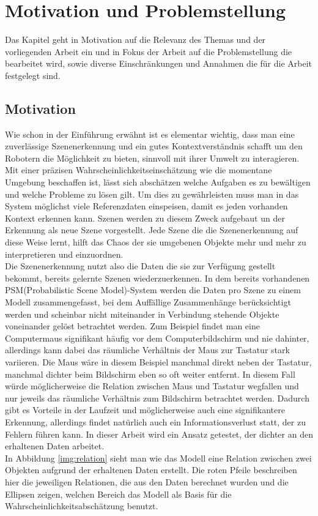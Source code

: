\chapter{Motivation und Problemstellung}\label{ch:motivation}
Das Kapitel geht in Motivation auf die Relevanz des Themas und der vorliegenden Arbeit ein und in Fokus der Arbeit auf die Problemstellung die bearbeitet wird, sowie diverse Einschränkungen und Annahmen die für die Arbeit festgelegt sind.

\section{Motivation}
Wie schon in der Einführung erwähnt ist es elementar wichtig, dass man eine zuverlässige Szenenerkennung und ein gutes Kontextverständnis schafft um den Robotern die Möglichkeit zu bieten, sinnvoll mit ihrer Umwelt zu interagieren. Mit einer präzisen Wahrscheinlichkeitseinschätzung wie die momentane Umgebung beschaffen ist, lässt sich abschätzen welche Aufgaben es zu bewältigen und welche Probleme zu lösen gilt. Um dies zu gewährleisten muss man in das System möglichst viele Referenzdaten einspeisen, damit es jeden vorhanden Kontext erkennen kann. Szenen werden zu diesem Zweck aufgebaut un der Erkennung als neue Szene vorgestellt. Jede Szene die die Szenenerkennung auf diese Weise lernt, hilft das Chaos der sie umgebenen Objekte mehr und mehr zu interpretieren und einzuordnen.\smallskip\\
Die Szenenerkennung nutzt also die Daten die sie zur Verfügung gestellt bekommt, bereits gelernte Szenen wiederzuerkennen. In dem bereits vorhandenen PSM(Probabilistic Scene Model)-System werden die Daten pro Szene zu einem Modell zusammengefasst, bei dem Auffällige Zusammenhänge berücksichtigt werden und scheinbar nicht miteinander in Verbindung stehende Objekte voneinander gelöst betrachtet werden. Zum Beispiel findet man eine Computermaus signifikant häufig vor dem Computerbildschirm und nie dahinter, allerdings kann dabei das räumliche Verhältnis der Maus zur Tastatur stark variieren. Die Maus wäre in diesem Beispiel manchmal direkt neben der Tastatur, manchmal dichter beim Bildschirm eben so oft weiter entfernt. In diesem Fall würde möglicherweise die Relation zwischen Maus und Tastatur wegfallen und nur jeweils das räumliche Verhältnis zum Bildschirm betrachtet werden. Dadurch gibt es Vorteile in der Laufzeit und möglicherweise auch eine signifikantere Erkennung, allerdings findet natürlich auch ein Informationsverlust statt, der zu Fehlern führen kann. In dieser Arbeit wird ein Ansatz getestet, der dichter an den erhaltenen Daten arbeitet.\smallskip\\
In Abbildung \ref{img:relation} sieht man wie das Modell eine Relation zwischen zwei Objekten aufgrund der erhaltenen Daten erstellt. Die roten Pfeile beschreiben hier die jeweiligen Relationen, die aus den Daten berechnet wurden und die Ellipsen zeigen, welchen Bereich das Modell als Basis für die Wahrscheinlichkeitsabschätzung benutzt.

